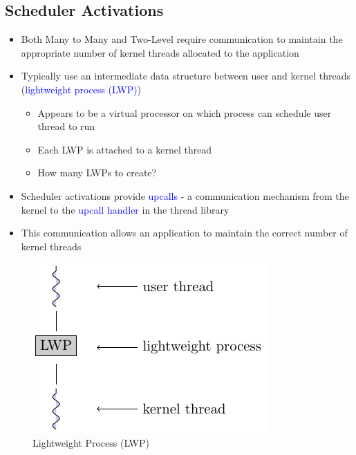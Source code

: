 \documentclass{book/custombook}
\begin{document}
            \subsection{Scheduler Activations}
                \begin{itemize}
                    \item Both Many to Many and Two-Level require communication to maintain the appropriate 
                    number of kernel threads allocated to the application
                    \item Typically use an intermediate data structure between user and kernel threads (\textcolor{blue}{lightweight process (LWP)})
                        \begin{itemize}
                            \item Appears to be a virtual processor on which process can schedule user thread to run
                            \item Each LWP is attached to a kernel thread
                            \item How many LWPs to create?
                        \end{itemize}
                    \item Scheduler activations provide \textcolor{blue}{upcalls} - a communication mechanism from the kernel
                    to the \textcolor{blue}{upcall handler} in the thread library
                    \item This communication allows an application to maintain the correct number of kernel threads
                \end{itemize}
                \begin{figure}[H]
                    \centering
                    \includegraphics{figures/lwp.pdf}
                    \caption{Lightweight Process (LWP)}
                \end{figure}
\end{document}
